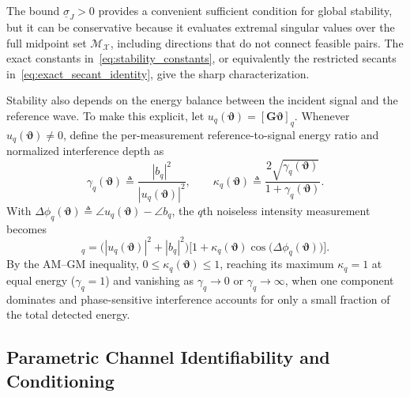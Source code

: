 \documentclass[journal]{IEEEtran}
\begin{document}
The bound $\underline{\sigma}_{J} > 0$ provides a convenient sufficient condition for global stability, but it can be conservative because it evaluates extremal singular values over the full midpoint set $\mathcal{M}_{\mathcal{X}}$, including directions that do not connect feasible pairs. The exact constants in~\eqref{eq:stability_constants}, or equivalently the restricted secants in~\eqref{eq:exact_secant_identity}, give the sharp characterization.

Stability also depends on the energy balance between the incident signal and the reference wave. To make this explicit, let $u_q(\boldsymbol{\vartheta}) = [\mathbf{G}\boldsymbol{\vartheta}]_q$. Whenever $u_q(\boldsymbol{\vartheta}) \neq 0$, define the per-measurement reference-to-signal energy ratio and normalized interference depth as
\begin{equation}
\gamma_q(\boldsymbol{\vartheta})
\triangleq \frac{|b_q|^2}{|u_q(\boldsymbol{\vartheta})|^2}, \qquad
\kappa_q(\boldsymbol{\vartheta})
\triangleq \frac{2\sqrt{\gamma_q(\boldsymbol{\vartheta})}}{1+\gamma_q(\boldsymbol{\vartheta})}.
\label{eq:reference_signal_energy_balance}
\end{equation}
With $\Delta\phi_q(\boldsymbol{\vartheta}) \triangleq \angle u_q(\boldsymbol{\vartheta}) - \angle b_q$, the $q$th noiseless intensity measurement becomes
\begin{equation}
[\mathcal{T}_{\mathbf{G},\mathbf{b}}(\boldsymbol{\vartheta})]_q
= \bigl(|u_q(\boldsymbol{\vartheta})|^2 + |b_q|^2\bigr)
\bigl[1 + \kappa_q(\boldsymbol{\vartheta})\cos\bigl(\Delta\phi_q(\boldsymbol{\vartheta})\bigr)\bigr].
\label{eq:normalized_reference_interference}
\end{equation}
By the AM--GM inequality, $0 \le \kappa_q(\boldsymbol{\vartheta}) \le 1$, reaching its maximum $\kappa_q = 1$ at equal energy ($\gamma_q = 1$) and vanishing as $\gamma_q \to 0$ or $\gamma_q \to \infty$, when one component dominates and phase-sensitive interference accounts for only a small fraction of the total detected energy.

\subsection{Parametric Channel Identifiability and Conditioning}
\label{subsec:parametric_channel_uniqueness}
\end{document}
